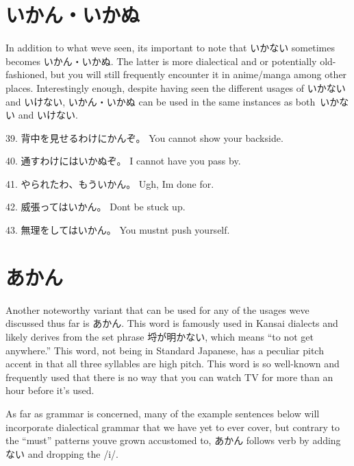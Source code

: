 \section{いかん・いかぬ}
 
\par{ In addition to what we\textquotesingle ve seen, it\textquotesingle s important to note that いかない sometimes becomes いかん・いかぬ. The latter is more dialectical and or potentially old-fashioned, but you will still frequently encounter it in anime\slash manga among other places. Interestingly enough, despite having seen the different usages of いかない and いけない, いかん・いかぬ can be used in the same instances as both いかない and いけない. }

\par{39. 背中を見せるわけにかんぞ。 \hfill\break
You cannot show your backside. }

\par{40. 通すわけにはいかぬぞ。 \hfill\break
I cannot have you pass by. }

\par{41. やられたわ、もういかん。 \hfill\break
Ugh, I\textquotesingle m done for. }

\par{42. 威張ってはいかん。 \hfill\break
Don\textquotesingle t be stuck up. }

\par{43. 無理をしてはいかん。 \hfill\break
You mustn\textquotesingle t push yourself. }
      
\section{あかん}
 
\par{ Another noteworthy variant that can be used for any of the usages we\textquotesingle ve discussed thus far is あかん. This word is famously used in Kansai dialects and likely derives from the set phrase 埒が明かない, which means “to not get anywhere.” This word, not being in Standard Japanese, has a peculiar pitch accent in that all three syllables are high pitch. This word is so well-known and frequently used that there is no way that you can watch TV for more than an hour before it's used. }

\par{ As far as grammar is concerned, many of the example sentences below will incorporate dialectical grammar that we have yet to ever cover, but contrary to the “must” patterns you\textquotesingle ve grown accustomed to, あかん follows verb by adding ない and dropping the \slash i\slash . }

